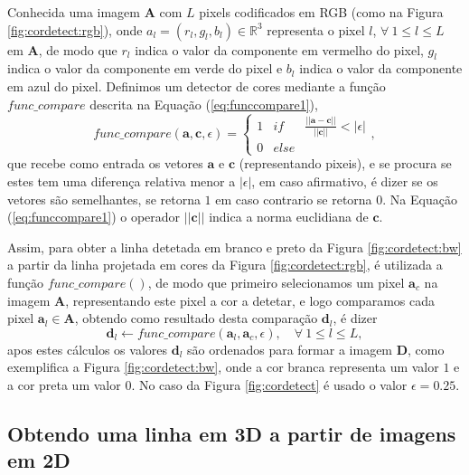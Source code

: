 \documentclass[a4paper, 12pt]{article}
\begin{document}
Conhecida uma imagem $\textbf{A}$ com $L$ pixels codificados 
em RGB (como na Figura \ref{fig:cordetect:rgb}), onde $a_l=(r_l,g_l,b_l)\in \mathbb{R}^3$
representa o pixel $l$, $\forall~1\leq l\leq L$ em $\textbf{A}$, 
de modo que
$r_l$ indica o valor da componente em vermelho do pixel,
$g_l$ indica o valor da componente em verde do pixel e
$b_l$ indica o valor da componente em azul do pixel.
Definimos um detector de cores mediante a função $func\_compare$ descrita na Equação (\ref{eq:funccompare1}),
\begin{equation}\label{eq:funccompare1}
func\_compare(\mathbf{a},\mathbf{c},\epsilon)=
\left\{
\begin{matrix}
1 & if   & \frac{||\mathbf{a}-\mathbf{c}||}{||\mathbf{c}||}<|\epsilon|\\
0 & else & ~
\end{matrix}
\right.,
\end{equation}
que recebe como entrada os vetores $\mathbf{a}$ e $\mathbf{c}$ 
(representando pixeis), e se procura se estes tem uma diferença relativa menor a $|\epsilon|$, 
em caso afirmativo, é dizer se os vetores são semelhantes, se retorna $1$ em caso contrario se retorna $0$.
Na Equação (\ref{eq:funccompare1}) o operador $||\mathbf{c}||$ indica a norma euclidiana de $\mathbf{c}$.


Assim, para obter a linha detetada em branco e preto da Figura \ref{fig:cordetect:bw} 
a partir da linha projetada em cores da Figura \ref{fig:cordetect:rgb}, 
é utilizada a função $func\_compare()$, de modo que primeiro selecionamos um pixel $\mathbf{a}_c$ na imagem $\mathbf{A}$,
representando este pixel a cor a detetar, e logo comparamos
cada pixel $\mathbf{a}_l \in \mathbf{A}$, obtendo como resultado desta comparação $\mathbf{d}_l$, é dizer
\begin{equation}\label{eq:funccompare2}
\mathbf{d}_l\leftarrow func\_compare(\mathbf{a}_l,\mathbf{a}_c,\epsilon),\quad \forall~ 1\leq l\leq L,
\end{equation}
apos estes cálculos os valores $\mathbf{d}_l$ são ordenados para formar a imagem $\mathbf{D}$, 
como exemplifica a Figura \ref{fig:cordetect:bw}, onde a cor branca representa um 
valor $1$ e a cor preta um valor $0$.
No caso da Figura \ref{fig:cordetect} é usado o valor $\epsilon=0.25$.



\subsection{Obtendo uma linha em 3D a partir de imagens em 2D}
\label{subsec:obtendolinha}
\end{document}
